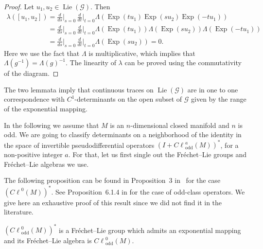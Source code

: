 \documentclass[pdftex]{sigma}
\DeclareMathOperator{\odd}{odd} \DeclareMathOperator{\supp}{supp}
\DeclareMathOperator{\Lie}{Lie} \DeclareMathOperator{\Det}{Det}
\DeclareMathOperator{\Exp}{Exp} \DeclareMathOperator{\rk}{rk}
\def \Cl {{C\ell}}
\begin{document}
\begin{proof}
Let $u_1, u_2\in \Lie({\mathcal{G}})$. Then
\begin{gather*}
\lambda([u_1,u_2])
    = \frac{d}{ds}\Big|_{s=0}\, \frac{d}{dt}\Big|_{t=0}
       \Lambda\left({\Exp}(tu_1){\Exp}(su_2){\Exp}(-tu_1)\right)\\
\phantom{\lambda([u_1,u_2])}{}
=\frac{d}{ds}\Big|_{s=0}\, \frac{d}{dt}\Big|_{t=0}
       \Lambda({\Exp}(tu_1))\Lambda({\Exp}(su_2))\Lambda({\Exp}(-tu_1))\\
\phantom{\lambda([u_1,u_2])}{}
 = \frac{d}{ds}\Big|_{s=0}\, \frac{d}{dt}\Big|_{t=0}
       \Lambda({\Exp}(su_2)) =0.
\end{gather*}
Here we use the fact that $\Lambda$ is multiplicative, which implies that $\Lambda(g^{-1})=\Lambda(g)^{-1}$. The linearity of $\lambda$ can be proved using the commutativity of the diagram.
\end{proof}

\begin{remark}\label{rk:Tracedeterminant}
The two lemmata imply that continuous traces on $\Lie({\mathcal{G}})$ are in one to one correspondence with $C^1$-determinants on the open subset of ${\mathcal{G}}$ given by the range of the exponential mapping.
\end{remark}

In the following we assume that $M$ is an $n$-dimensional closed manifold and $n$ is odd. We are going to classify determinants on a neighborhood of the identity in the space of invertible pseudodif\/ferential operators $(I+\Cl^{a}_{\odd}(M))^*$, for a non-positive integer $a$. For that, let us f\/irst single out the Fr\'echet--Lie groups and Fr\'echet--Lie algebras we use.

The following proposition can be found in Proposition~3 in~\cite{lescure} for the case $(\Cl^{0}(M))^*$. See Proposition~6.1.4 in \cite{ouedraogothese} for the case of odd-class operators. We give here an exhaustive proof of this result since we did not f\/ind it in the literature.

\begin{proposition}\label{prop:LieGroupLieAlgebraCl^{0}_{odd}(M)}
$\left(\Cl^{0}_{\odd}(M)\right)^*$ is a Fr\'echet--Lie group which admits an exponential mapping and its Fr\'echet--Lie algebra is $\Cl^{0}_{\odd}(M)$.
\end{proposition}
\end{document}
